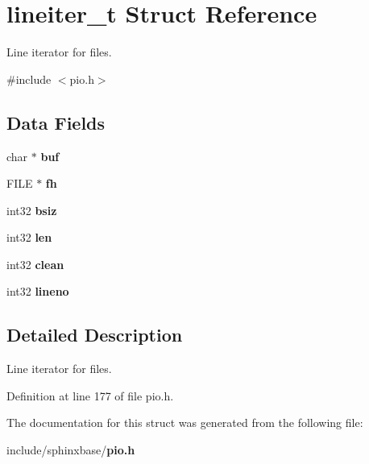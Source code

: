 \section{lineiter\+\_\+t Struct Reference}
\label{structlineiter__t}


Line iterator for files.  




{\ttfamily \#include $<$pio.\+h$>$}

\subsection*{Data Fields}
\begin{DoxyCompactItemize}
\item 
char $\ast$ {\bfseries buf}\label{structlineiter__t_a1bf482b3c2722af76102f7b4aae08e47}

\item 
F\+I\+L\+E $\ast$ {\bfseries fh}\label{structlineiter__t_a08628d796a4850494f29f62dc0e55148}

\item 
int32 {\bfseries bsiz}\label{structlineiter__t_ac74d820746ced8a422c37ec48c592827}

\item 
int32 {\bfseries len}\label{structlineiter__t_ae40e5af2b7e231200d597610840c1e34}

\item 
int32 {\bfseries clean}\label{structlineiter__t_a800c26617f85d52aa4f3c8f6c3e6f96a}

\item 
int32 {\bfseries lineno}\label{structlineiter__t_ae8215b7dfb61b9718dab96c7c9d22311}

\end{DoxyCompactItemize}


\subsection{Detailed Description}
Line iterator for files. 

Definition at line 177 of file pio.\+h.



The documentation for this struct was generated from the following file\+:\begin{DoxyCompactItemize}
\item 
include/sphinxbase/{\bf pio.\+h}\end{DoxyCompactItemize}
